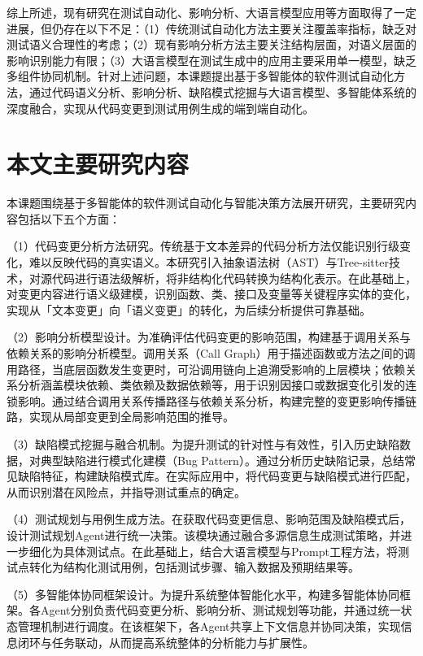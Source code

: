综上所述，现有研究在测试自动化、影响分析、大语言模型应用等方面取得了一定进展，但仍存在以下不足：（1）传统测试自动化方法主要关注覆盖率指标，缺乏对测试语义合理性的考虑；（2）现有影响分析方法主要关注结构层面，对语义层面的影响识别能力有限；（3）大语言模型在测试生成中的应用主要采用单一模型，缺乏多组件协同机制。针对上述问题，本课题提出基于多智能体的软件测试自动化方法，通过代码语义分析、影响分析、缺陷模式挖掘与大语言模型、多智能体系统的深度融合，实现从代码变更到测试用例生成的端到端自动化。

\section{本文主要研究内容}
本课题围绕基于多智能体的软件测试自动化与智能决策方法展开研究，主要研究内容包括以下五个方面：

（1）代码变更分析方法研究。传统基于文本差异的代码分析方法仅能识别行级变化，难以反映代码的真实语义。本研究引入抽象语法树（AST）与Tree-sitter技术，对源代码进行语法级解析，将非结构化代码转换为结构化表示\cite{Kimmig2018TreeSitter}。在此基础上，对变更内容进行语义级建模，识别函数、类、接口及变量等关键程序实体的变化，实现从「文本变更」向「语义变更」的转化，为后续分析提供可靠基础。

（2）影响分析模型设计。为准确评估代码变更的影响范围，构建基于调用关系与依赖关系的影响分析模型。调用关系（Call Graph）用于描述函数或方法之间的调用路径，当底层函数发生变更时，可沿调用链向上追溯受影响的上层模块；依赖关系分析涵盖模块依赖、类依赖及数据依赖等，用于识别因接口或数据变化引发的连锁影响\cite{Horwitz1990,Nielson2010Static}。通过结合调用关系传播路径与依赖关系分析，构建完整的变更影响传播链路，实现从局部变更到全局影响范围的推导。

（3）缺陷模式挖掘与融合机制。为提升测试的针对性与有效性，引入历史缺陷数据，对典型缺陷进行模式化建模（Bug Pattern）。通过分析历史缺陷记录，总结常见缺陷特征，构建缺陷模式库。在实际应用中，将代码变更与缺陷模式进行匹配，从而识别潜在风险点，并指导测试重点的确定。

（4）测试规划与用例生成方法。在获取代码变更信息、影响范围及缺陷模式后，设计测试规划Agent进行统一决策。该模块通过融合多源信息生成测试策略，并进一步细化为具体测试点。在此基础上，结合大语言模型与Prompt工程方法，将测试点转化为结构化测试用例，包括测试步骤、输入数据及预期结果等\cite{Wang2021CodeT5}。

（5）多智能体协同框架设计。为提升系统整体智能化水平，构建多智能体协同框架。各Agent分别负责代码变更分析、影响分析、测试规划等功能，并通过统一状态管理机制进行调度。在该框架下，各Agent共享上下文信息并协同决策，实现信息闭环与任务联动，从而提高系统整体的分析能力与扩展性。

